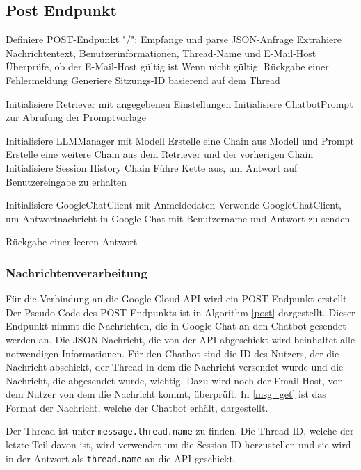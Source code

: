 \subsection{Post Endpunkt}
\begin{algorithm}
    \caption{POST Endpunkt}
    \begin{algorithmic}[1]
    \STATE Definiere POST-Endpunkt "/":
    \STATE \quad Empfange und parse JSON-Anfrage
    \STATE \quad Extrahiere Nachrichtentext, Benutzerinformationen, Thread-Name und E-Mail-Host
    \STATE \quad Überprüfe, ob der E-Mail-Host gültig ist
    \STATE \quad \quad Wenn nicht gültig:
    \STATE \quad \quad \quad Rückgabe einer Fehlermeldung
    \STATE \quad Generiere Sitzungs-ID basierend auf dem Thread
    
    \STATE \quad Initialisiere Retriever mit angegebenen Einstellungen
    \STATE \quad Initialisiere ChatbotPrompt zur Abrufung der Promptvorlage
    
    \STATE \quad Initialisiere LLMManager mit Modell
    \STATE \quad Erstelle eine Chain aus Modell und Prompt
    \STATE \quad Erstelle eine weitere Chain aus dem Retriever und der vorherigen Chain
    \STATE \quad Initialisiere Session History Chain 
    \STATE \quad Führe Kette aus, um Antwort auf Benutzereingabe zu erhalten
    
    \STATE \quad Initialisiere GoogleChatClient mit Anmeldedaten
    \STATE \quad Verwende GoogleChatClient, um Antwortnachricht in Google Chat mit Benutzername und Antwort zu senden
    
    \STATE \quad Rückgabe einer leeren Antwort
    \end{algorithmic}
    \label{post}
    \end{algorithm}

\subsubsection{Nachrichtenverarbeitung}
Für die Verbindung an die Google Cloud API wird ein 
POST Endpunkt erstellt. Der Pseudo Code des POST Endpunkts 
ist in Algorithm \ref*{post} dargestellt. Dieser Endpunkt nimmt die Nachrichten, 
die in Google Chat an den Chatbot gesendet werden an.
Die JSON Nachricht, die von der API abgeschickt wird beinhaltet 
alle notwendigen Informationen. Für den Chatbot sind die ID des Nutzers, 
der die Nachricht abschickt, der Thread in dem die Nachricht 
versendet wurde und die Nachricht, die abgesendet wurde, wichtig.
Dazu wird noch der Email Host, von dem Nutzer von dem die Nachricht kommt, überprüft.
In \ref*{msg_get} ist das Format der Nachricht, welche der Chatbot 
erhält, dargestellt.\par
Der Thread ist unter \verb|message.thread.name| zu finden. Die Thread 
ID, welche der letzte Teil davon ist, wird verwendet um die 
Session ID herzustellen und sie wird in der Antwort als \verb|thread.name| an die API
geschickt.\par

